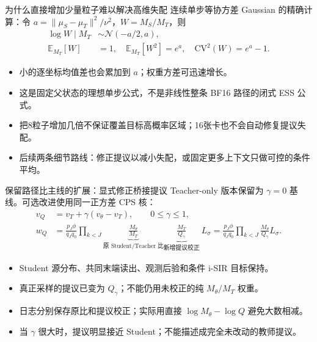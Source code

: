 \documentclass[10pt,aspectratio=169]{beamer}
\newcommand{\E}{\mathbb E}
\newcommand{\N}{\mathcal N}
\begin{document}
\begin{frame}{为什么直接增加少量粒子难以解决高维失配}
\small
连续单步等协方差 Gaussian 的精确计算：令
$a=\|\mu_S-\mu_T\|^2/\nu^2$，$W=M_S/M_T$，则
\begin{align}
\log W\mid M_T&\sim\N(-a/2,a),\\
\E_{M_T}[W]&=1,\quad \E_{M_T}[W^2]=e^a,
\quad\mathrm{CV}^2(W)=e^a-1.
\end{align}
\begin{itemize}\itemsep5pt
\item 小的逐坐标均值差也会累加到 $a$；权重方差可迅速增长。
\item 这是固定父状态的理想单步公式，不是非线性整条 BF16 路径的闭式 ESS 公式。
\item 把8粒子增加几倍不保证覆盖目标高概率区域；16张卡也不会自动修复提议失配。
\item 后续两条细节路线：修正提议以减小失配，或固定更多上下文只做可控的条件平均。
\end{itemize}
\end{frame}

\begin{frame}{保留路径比主线的扩展：显式修正桥接提议}
\small
Teacher-only 版本保留为 $\gamma=0$ 基线。可选改进使用同一正方差 CPS 核：
\begin{align}
v_Q&=v_T+\gamma(v_\theta-v_T),\qquad 0\leq\gamma\leq1,\\
w_Q&=\frac{p_J\phi}{q_Jq_0}\prod_{k<J}
\underbrace{\frac{M_\theta}{M_T}}_{\text{原 Student/Teacher 比}}
\underbrace{\frac{M_T}{Q_\gamma}}_{\text{新增提议校正}}\ L_\sigma
=\frac{p_J\phi}{q_Jq_0}\prod_{k<J}\frac{M_\theta}{Q_\gamma}L_\sigma.
\end{align}
\begin{itemize}\itemsep5pt
\item Student 源分布、共同末端读出、观测后验和条件 i-SIR 目标保持。
\item 真正采样的提议已变为 $Q_\gamma$；不能仍用未校正的纯 $M_\theta/M_T$ 权重。
\item 日志分别保存原比和提议校正；实际用直接 $\log M_\theta-\log Q$ 避免大数相减。
\item 当 $\gamma$ 很大时，提议明显接近 Student；不能描述成完全未改动的教师提议。
\end{itemize}
\end{frame}
\end{document}
